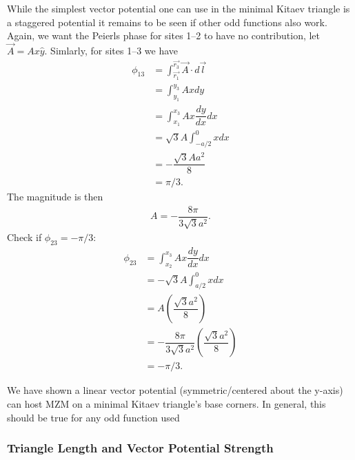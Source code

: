 While the simplest vector potential one can use in the minimal Kitaev triangle is a staggered potential it remains to be seen if other odd functions also work.
Again, we want the Peierls phase for sites 1--2 to have no contribution, let $\vec{A} = Ax\hat{y}$.
Simlarly, for sites 1--3 we have
\begin{align}
  \phi_{13} &= \int_{\vec{r_1}}^{\vec{r_3}} \vec{A} \cdot d\vec{l} \nonumber \\
  &= \int_{y_1}^{y_3} Ax dy \nonumber \\
  &= \int_{x_1}^{x_3} Ax \dfrac{dy}{dx} dx \nonumber \\
  &= \sqrt{3} A \int_{-a/2}^{0} x dx \nonumber \\
  &= -\dfrac{\sqrt{3} A a^2}{8}  \nonumber \\
  &= \pi/3. \nonumber
\end{align}
The magnitude is then
\begin{align}
  A = -\dfrac{8 \pi}{3 \sqrt{3} a^2}.
\end{align}
Check if $\phi_{23} = -\pi/3$:
\begin{align}
  \phi_{23} &= \int_{x_2}^{x_3} Ax \dfrac{dy}{dx} dx \nonumber \\
  &= -\sqrt{3} A \int^{0}_{a/2} x dx \nonumber \\
  &= A \left(\dfrac{\sqrt{3} a^2}{8}\right)  \nonumber \\
  &= -\dfrac{8 \pi}{3 \sqrt{3} a^2} \left(\dfrac{\sqrt{3} a^2}{8}\right)  \nonumber \\
  &= -\pi/3 \nonumber.
\end{align}

We have shown a linear vector potential (symmetric/centered about the y-axis) can host MZM on a minimal Kitaev triangle's base corners.
In general, this should be true for any odd function used
\subsubsection{Triangle Length and Vector Potential Strength}


